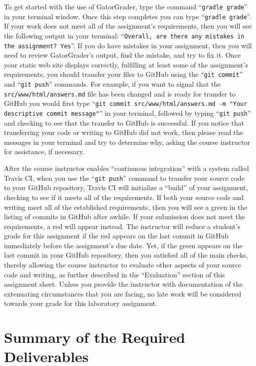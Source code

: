 \documentclass[11pt]{article}
\newcommand{\mainprogramsource}{\lstinline{src/www/html/answers.md}}
\newcommand{\gatorgraderstart}{\command{gradle grade}}
\newcommand{\gatorgradercheck}{\command{gradle grade}}
\newcommand{\gitcommit}{\command{git commit}}
\newcommand{\gitpush}{\command{git push}}
\newcommand{\gitcommitmainprogram}{\command{git commit src/www/html/answers.md -m "Your
descriptive commit message"}}
\newcommand{\command}[1]{``\lstinline{#1}''}
\newcommand{\step}[1]{``{#1}''}
\newcommand{\checkmark}{\ding{51}}
\newcommand{\naughtmark}{\ding{55}}
\begin{document}
To get started with the use of GatorGrader, type the command \gatorgraderstart{}
in your terminal window. Once this step completes you can type
\gatorgradercheck{}. If your work does not meet all of the assignment's
requirements, then you will see the following output in your terminal:
\command{Overall, are there any mistakes in the assignment? Yes}. If you do have
mistakes in your assignment, then you will need to review GatorGrader's output,
find the mistake, and try to fix it. Once your static web site displays
correctly, fulfilling at least some of the assignment's requirements, you should
transfer your files to GitHub using the \gitcommit{} and \gitpush{} commands.
For example, if you want to signal that the \mainprogramsource{} file has been
changed and is ready for transfer to GitHub you would first type
\gitcommitmainprogram{} in your terminal, followed by typing \gitpush{} and
checking to see that the transfer to GitHub is successful. If you notice that
transferring your code or writing to GitHub did not work, then please read the
messages in your terminal and try to determine why, asking the course instructor
for assistance, if necessary.

After the course instructor enables \step{continuous integration} with a system
called Travis CI, when you use the \gitpush{} command to transfer your source
code to your GitHub repository, Travis CI will initialize a \step{build} of your
assignment, checking to see if it meets all of the requirements. If both your
source code and writing meet all of the established requirements, then you will
see a green \checkmark{} in the listing of commits in GitHub after awhile. If
your submission does not meet the requirements, a red \naughtmark{} will appear
instead. The instructor will reduce a student's grade for this assignment if the
red \naughtmark{} appears on the last commit in GitHub immediately before the
assignment's due date. Yet, if the green \checkmark{} appears on the last commit
in your GitHub repository, then you satisfied all of the main checks, thereby
allowing the course instructor to evaluate other aspects of your source code and
writing, as further described in the \step{Evaluation} section of this
assignment sheet. Unless you provide the instructor with documentation of the
extenuating circumstances that you are facing, no late work will be considered
towards your grade for this laboratory assignment.

\section*{Summary of the Required Deliverables}
\end{document}
